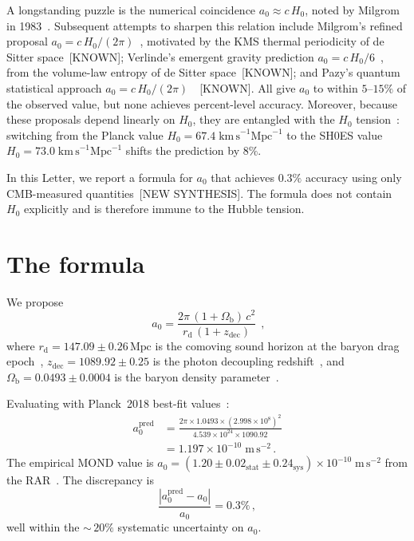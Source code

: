 \documentclass[prl,twocolumn,superscriptaddress,longbibliography]{revtex4-2}
\newcommand{\Mpc}{\,\mathrm{Mpc}}
\newcommand{\zdec}{z_{\mathrm{dec}}}
\newcommand{\rd}{r_{\mathrm{d}}}
\newcommand{\Ob}{\Omega_{\mathrm{b}}}
\newcommand{\azero}{a_0}
\newcommand{\ms}{\mathrm{m\,s}^{-2}}
\begin{document}
A longstanding puzzle is the numerical coincidence
$\azero \approx c\,H_0$, noted by Milgrom in
1983~\cite{Milgrom1983}.
Subsequent attempts to sharpen this relation include
Milgrom's refined proposal
$\azero = c\,H_0/(2\pi)$~\cite{Milgrom1999}, motivated by
the KMS thermal periodicity of de Sitter
space~[KNOWN];
Verlinde's emergent gravity prediction
$\azero = c\,H_0/6$~\cite{Verlinde2016}, from the
volume-law entropy of de Sitter space~[KNOWN]; and
Pazy's quantum statistical approach
$\azero = c\,H_0/(2\pi)$~\cite{Pazy2013}~[KNOWN].
All give $\azero$ to within $5$--$15\%$ of the
observed value, but none achieves percent-level
accuracy.
Moreover, because these proposals depend linearly on $H_0$,
they are entangled with the $H_0$
tension~\cite{Freedman2021}: switching from the
Planck value $H_0 = 67.4\;\mathrm{km\,s}^{-1}\mathrm{Mpc}^{-1}$
to the SH0ES value
$H_0 = 73.0\;\mathrm{km\,s}^{-1}\mathrm{Mpc}^{-1}$
shifts the prediction by $8\%$.

In this Letter, we report a formula for $\azero$
that achieves $0.3\%$ accuracy using only CMB-measured
quantities~[NEW SYNTHESIS].
The formula does not contain $H_0$ explicitly and is
therefore immune to the Hubble tension.


\section{The formula}
\label{sec:formula}

We propose
\begin{equation}
  \boxed{\;
  \azero
  = \frac{2\pi\,(1+\Ob)\,c^2}{\rd\,(1+\zdec)} \;} \,,
  \label{eq:master}
\end{equation}
where $\rd = 147.09 \pm 0.26\Mpc$ is the comoving
sound horizon at the baryon drag
epoch~\cite{Planck2018}, $\zdec = 1089.92 \pm 0.25$
is the photon decoupling redshift~\cite{Planck2018},
and $\Ob = 0.0493 \pm 0.0004$ is the baryon density
parameter~\cite{Planck2018}.

Evaluating with Planck~2018 best-fit
values~\cite{Planck2018}:
\begin{align}
  \azero^{\mathrm{pred}}
  &= \frac{2\pi \times 1.0493
     \times (2.998 \times 10^{8})^2}
     {4.539 \times 10^{24}
     \times 1090.92} \nonumber \\
  &= 1.197 \times 10^{-10}\;\ms \,.
  \label{eq:numerical}
\end{align}
The empirical MOND value is
$\azero = (1.20 \pm 0.02_{\mathrm{stat}}
\pm 0.24_{\mathrm{sys}}) \times 10^{-10}\;\ms$
from the RAR~\cite{McGaugh2016,Lelli2017}.
The discrepancy is
\begin{equation}
  \frac{|\azero^{\mathrm{pred}} - \azero|}{\azero}
  = 0.3\% \,,
  \label{eq:accuracy}
\end{equation}
well within the ${\sim}\,20\%$ systematic uncertainty
on $\azero$.
\end{document}
